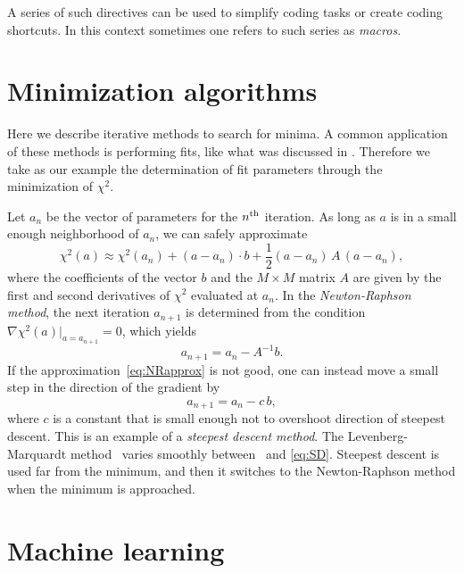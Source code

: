 A series of such directives can be used to simplify coding tasks or create
coding shortcuts. In this context sometimes one refers to such series as {\it
macros}.


\section{Minimization algorithms}

Here we describe iterative methods to search for minima.
A common application of these methods is performing fits,
like what was discussed in . Therefore we take as our
example the determination of fit parameters through the minimization of $\chi^2$.

Let $a_n$ be the vector of parameters for the $n{}^{\rm th}$ iteration.
As long as $a$ is in a small enough neighborhood of $a_n$, we can safely
approximate
\begin{equation}\label{eq:NRapprox}
  \chi^2(a)\approx\chi^2(a_n)+(a-a_n)\cdot b
           +\frac{1}{2}(a-a_n)\,A\,(a-a_n),
\end{equation}
where the coefficients of the vector $b$ and the $M\times M$ matrix $A$ 
are given by the first and second derivatives of $\chi^2$ evaluated at $a_n$.
In the {\it Newton-Raphson method}, the next 
iteration $a_{n+1}$ is
determined from the condition $\nabla\chi^2(a)|_{a=a_{n+1}}=0$,
which yields
\begin{equation}\label{eq:NR}
  a_{n+1}=a_n-A^{-1}b.
\end{equation}
If the approximation~\eqref{eq:NRapprox} is not good, one can instead move
a small step in the direction of the gradient by
\begin{equation}\label{eq:SD}
  a_{n+1}=a_n-c\,b,
\end{equation}
where $c$ is a constant that is small enough not to overshoot direction
of steepest descent. This is an example of a {\it steepest descent method}.
The Levenberg-Marquardt 
method~\cite{levenberg_method_1944,marquardt_algorithm_1963} 
varies smoothly between~ and 
\eqref{eq:SD}. Steepest descent is used far from the minimum, and 
then it switches to the Newton-Raphson method when the minimum is approached.


\section{Machine learning}\label{sec:ML}

